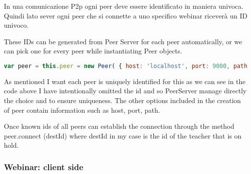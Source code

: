 In una comunicazione P2p ogni peer deve essere identificato in maniera univoca. Quindi lato sever ogni peer che si connette a uno specifico webinar riceverà un ID univoco. 

These IDs can be generated from Peer Server for each peer automatically, or we can pick one for every peer while instantiating Peer objects.



\begin{lstlisting}[language=javascript]
var peer = this.peer = new Peer( { host: 'localhost', port: 9000, path: '/peerjs'});
\end{lstlisting}

As mentioned I want each peer is uniquely identified for this as we can see in the code above I have intentionally omitted the id and so PeerServer manage directly the choice and to ensure uniqueness.
The other options included in the creation of peer contain information such as host, port, path.


Once known ids of all peers can establish the connection through the method
peer.connect (destId) where destId in my case is the id of the teacher that is on hold.

\subsubsection{Webinar: client side}

